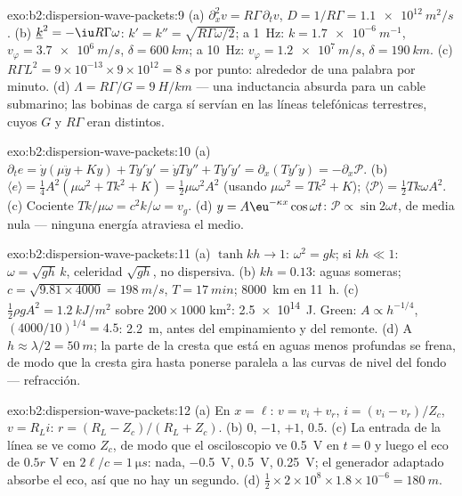 \begin{solution}{exo:b2:dispersion-wave-packets:9}
(a) $\partial_x^2v = R\Gamma\,\partial_tv$, $D = 1/R\Gamma = \qty{1.1e12}{m^2/s}$. (b) $\underline k^2
= -\iu R\Gamma\omega$: $k' = k'' = \sqrt{R\Gamma\omega/2}$; a \qty{1}{Hz}: $k = \qty{1.7e-6}{m^{-1}}$,
$v_\varphi = \qty{3.7e6}{m/s}$, $\delta = \qty{600}{km}$; a \qty{10}{Hz}: $v_\varphi = \qty{1.2e7}{m/s}$,
$\delta = \qty{190}{km}$. (c) $R\Gamma L^2 = 9 \times 10^{-13} \times 9 \times 10^{12} = \qty{8}{s}$
por punto: alrededor de una palabra por minuto. (d) $\Lambda = R\Gamma/G = \qty{9}{H/km}$ --- una
inductancia absurda para un cable submarino; las bobinas de carga sí
servían en las líneas telefónicas terrestres, cuyos $G$ y $R\Gamma$ eran distintos.
\end{solution}

\begin{solution}{exo:b2:dispersion-wave-packets:10}
(a) $\partial_te = \dot y(\mu\ddot y + Ky) + Ty'\dot y' = \dot yTy'' + Ty'\dot y' = \partial_x
(Ty'\dot y) = -\partial_x\mathcal P$. (b) $\langle e\rangle = \tfrac14A^2(\mu\omega^2 + Tk^2 + K) =
\tfrac12\mu\omega^2A^2$ (usando $\mu\omega^2 = Tk^2 + K$); $\langle\mathcal P\rangle = \tfrac12Tk\omega
A^2$. (c) Cociente $Tk/\mu\omega = c^2k/\omega = v_g$. (d) $y = A\eu^{-\kappa x}\cos\omega t$:
$\mathcal P \propto \sin2\omega t$, de media nula --- ninguna energía atraviesa el medio.
\end{solution}

\begin{solution}{exo:b2:dispersion-wave-packets:11}
(a) $\tanh kh \to 1$: $\omega^2 = gk$; si $kh \ll 1$: $\omega = \sqrt{gh}\,k$, celeridad $\sqrt{gh}$,
no dispersiva. (b) $kh = 0.13$: aguas someras; $c = \sqrt{9.81 \times 4000} = \qty{198}{m/s}$,
$T = \qty{17}{min}$; \qty{8000}{km} en \qty{11}{h}. (c) $\tfrac12\rho gA^2 = \qty{1.2}{kJ/m^2}$
sobre $200 \times 1000$ km$^2$: \qty{2.5e14}{J}. Green: $A \propto h^{-1/4}$, $(4000/10)^{1/4}
= 4.5$: \qty{2.2}{m}, antes del empinamiento y del remonte. (d) A $h \approx \lambda/2 =
\qty{50}{m}$; la parte de la cresta que está en aguas menos profundas se
frena, de modo que la cresta gira hasta ponerse paralela a las curvas de
nivel del fondo --- refracción.
\end{solution}

\begin{solution}{exo:b2:dispersion-wave-packets:12}
(a) En $x = \ell$: $v = v_i + v_r$, $i = (v_i - v_r)/Z_c$, $v = R_Li$: $r = (R_L -
Z_c)/(R_L + Z_c)$. (b) $0$, $-1$, $+1$, $0.5$. (c) La entrada de la línea se ve como
$Z_c$, de modo que el osciloscopio ve \qty{0.5}{V} en $t = 0$ y luego el eco de $0.5r$ V en
$2\ell/c = \qty{1}{\micro s}$: nada, \qty{-0.5}{V}, \qty{+0.5}{V}, \qty{+0.25}{V}; el
generador adaptado absorbe el eco, así que no hay un segundo. (d)
$\tfrac12 \times 2 \times 10^8 \times 1.8 \times 10^{-6} = \qty{180}{m}$.
\end{solution}

